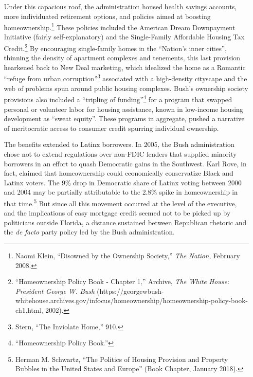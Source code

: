 \documentclass[12pt,oneside]{psthesis}
\begin{document}
Under this capacious roof, the administration housed health savings accounts, more individuated retirement options, and policies aimed at boosting homeownership.\footnote{Naomi Klein, ``Disowned by the Ownership Society,'' \emph{The Nation}, February 2008.}
These policies included the American Dream Downpayment Initiative (fairly self-explanatory) and the Single-Family Affordable Housing Tax Credit.\footnote{``Homeownership Policy Book - Chapter 1,'' Archive, \emph{The White House: President George W. Bush} (https://georgewbush-whitehouse.archives.gov/infocus/homeownership/homeownership-policy-book-ch1.html, 2002).}
By encouraging single-family homes in the ``Nation's inner cities'', thinning the density of apartment complexes and tenements, this last provision hearkened back to New Deal marketing, which idealized the home as a Romantic ``refuge from urban corruption''\footnote{Stern, ``The Inviolate Home,'' 910.} associated with a high-density cityscape and the web of problems spun around public housing complexes.
Bush's ownership society provisions also included a ``tripling of funding''\footnote{``Homeownership Policy Book.''} for a program that swapped personal or volunteer labor for housing assistance, known in low-income housing development as ``sweat equity''.
These programs in aggregate, pushed a narrative of meritocratic access to consumer credit spurring individual ownership.

The benefits extended to Latinx borrowers.
In 2005, the Bush administration chose not to extend regulations over non-FDIC lenders that supplied minority borrowers in an effort to quash Democratic gains in the Southwest.
Karl Rove, in fact, claimed that homeownership could economically conservatize Black and Latinx voters.
The 9\% drop in Democratic share of Latinx voting between 2000 and 2004 may be partially attributable to the 2.8\% spike in homeownership in that time.\footnote{Herman M. Schwartz, ``The Politics of Housing Provision and Property Bubbles in the United States and Europe'' (Book Chapter, January 2018).}
But since all this movement occurred at the level of the executive, and the implications of easy mortgage credit seemed not to be picked up by politicians outside Florida, a distance sustained between Republican rhetoric and the \emph{de facto} party policy led by the Bush administration.
\end{document}
